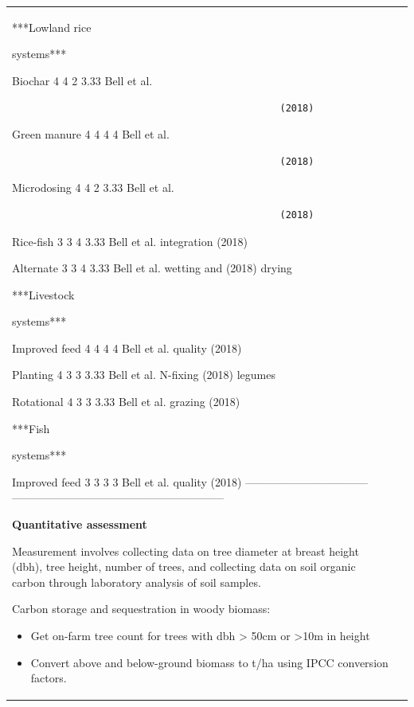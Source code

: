 \documentclass[
  letterpaper,
  DIV=11,
  numbers=noendperiod]{scrreprt}
\begin{document}
\begin{longtable}[]{@{}
  >{\raggedright\arraybackslash}p{}
  >{\raggedright\arraybackslash}p{}@{}}
\begin{minipage}[t]{\linewidth}
***Lowland rice

systems***

Biochar 4 4 2 3.33 Bell et al.

\begin{verbatim}
                                               (2018)
\end{verbatim}

Green manure 4 4 4 4 Bell et al.

\begin{verbatim}
                                               (2018)
\end{verbatim}

Microdosing 4 4 2 3.33 Bell et al.

\begin{verbatim}
                                               (2018)
\end{verbatim}

Rice-fish 3 3 4 3.33 Bell et al. integration (2018)

Alternate 3 3 4 3.33 Bell et al. wetting and (2018) drying

***Livestock

systems***

Improved feed 4 4 4 4 Bell et al. quality (2018)

Planting 4 3 3 3.33 Bell et al. N-fixing (2018) legumes

Rotational 4 3 3 3.33 Bell et al. grazing (2018)

***Fish

systems***

Improved feed 3 3 3 3 Bell et al. quality (2018)
---------------------------------
---------------------------------------------------------

\textbf{Quantitative assessment}

Measurement involves collecting data on tree diameter at breast height
(dbh), tree height, number of trees, and collecting data on soil organic
carbon through laboratory analysis of soil samples.

Carbon storage and sequestration in woody biomass:

\begin{itemize}
\item
  Get on-farm tree count for trees with dbh \textgreater{} 50cm or
  \textgreater10m in height
\item
  Convert above and below-ground biomass to t/ha using IPCC conversion
  factors.
\end{itemize}


\end{minipage}
\end{longtable}
\end{document}
